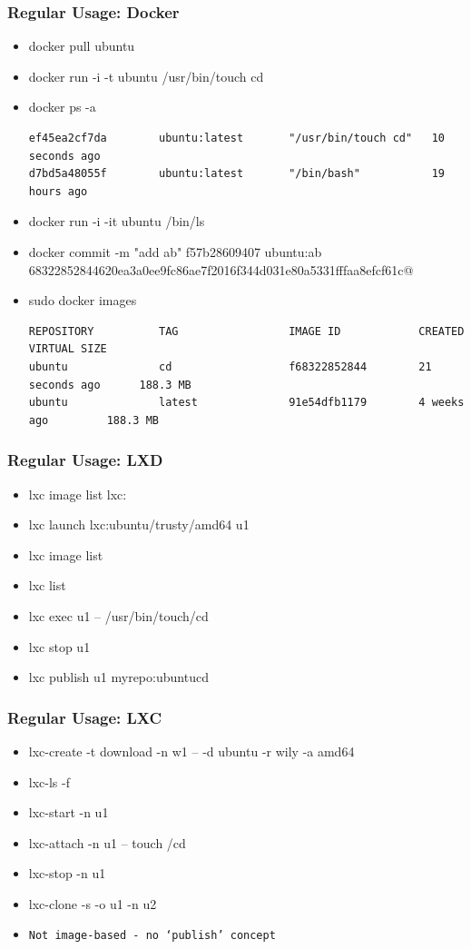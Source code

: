 \documentclass{beamer}
\begin{document}
\begin{frame}[fragile]
\frametitle{Regular Usage: Docker}
\begin{itemize}
\item docker pull ubuntu
\item docker run -i -t ubuntu /usr/bin/touch cd
\item docker ps -a
{\tiny
\begin{verbatim}
ef45ea2cf7da        ubuntu:latest       "/usr/bin/touch cd"   10 seconds ago
d7bd5a48055f        ubuntu:latest       "/bin/bash"           19 hours ago
\end{verbatim}
}

\item docker run -i -it ubuntu /bin/ls
\item docker commit -m "add ab" f57b28609407 ubuntu:ab
{\tiny
\verb@f68322852844620ea3a0ee9fc86ae7f2016f344d031e80a5331fffaa8efcf61c@
}

\item sudo docker images
{\tiny
\begin{verbatim}
REPOSITORY          TAG                 IMAGE ID            CREATED             VIRTUAL SIZE
ubuntu              cd                  f68322852844        21 seconds ago      188.3 MB
ubuntu              latest              91e54dfb1179        4 weeks ago         188.3 MB
\end{verbatim}
}
\end{itemize}
\end{frame}

\begin{frame}
\frametitle{Regular Usage: LXD}
\begin{itemize}
\item lxc image list lxc:
\item lxc launch lxc:ubuntu/trusty/amd64 u1
\item lxc image list
\item lxc list
\item lxc exec u1 -- /usr/bin/touch/cd
\item lxc stop u1
\item lxc publish u1 myrepo:ubuntucd
\end{itemize}
\end{frame}

\begin{frame}
\frametitle{Regular Usage: LXC}
\begin{itemize}
\item lxc-create -t download -n w1 -- -d ubuntu -r wily -a amd64
\item lxc-ls -f
\item lxc-start -n u1
\item lxc-attach -n u1 -- touch /cd
\item lxc-stop -n u1
\item lxc-clone -s -o u1 -n u2
\item \texttt{Not image-based - no `publish' concept}
\end{itemize}
\end{frame}
\end{document}
